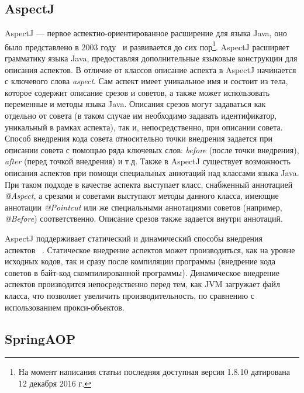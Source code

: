 \documentclass[conference]{IEEEtran}
\begin{document}
\subsection{AspectJ}
AspectJ --- первое аспектно-ориентированное расширение для языка Java, оно 
было представлено в 2003 году~\cite{kiczales_aspectj} и развивается до сих 
пор\footnote{На момент написания статьи последняя доступная версия 1.8.10 
датирована 12 декабря 2016 г.}.
AspectJ расширяет грамматику языка Java, предоставляя дополнительные языковые
конструкции для описания аспектов.
В отличие от классов описание аспекта в AspectJ начинается с ключевого слова
\textit{aspect}. Сам аспект имеет уникальное имя и состоит из тела, которое 
содержит описание срезов и советов, а также может использовать переменные и 
методы языка Java.
Описания срезов могут задаваться как отдельно от совета (в таком случае им
необходимо задавать идентификатор, уникальный в рамках аспекта), так и,
непосредственно, при описании совета.
Способ внедрения кода совета относительно точки внедрения задается при
описании совета с помощью ряда ключевых слов: \textit{before} (после точки
внедрения), \textit{after} (перед точкой внедрения) и т.д.
Также в AspectJ существует возможность описания аспектов при помощи специальных
аннотаций над классами языка Java.
При таком подходе в качестве аспекта выступает класс, снабженный аннотацией
\textit{@Aspect}, а срезами и советами выступают методы данного класса,
имеющие аннотации \textit{@Pointcut} или же специальными аннотациями советов
(например, \textit{@Before}) соответственно.
Описание срезов также задается внутри аннотаций.

AspectJ поддерживает статический и динамический способы внедрения аспектов~
\cite{aspectj_doc}.
Статическое внедрение аспектов может производиться, как на уровне исходных
кодов, так и сразу после компиляции программы (внедрение кода советов в байт-код
скомпилированной программы).
Динамическое внедрение аспектов производится непосредственно перед тем, как JVM
загружает файл класса, что позволяет увеличить производительность, по сравнению
с использованием прокси-объектов.


\subsection{SpringAOP}
\end{document}
